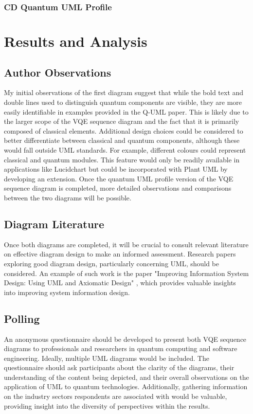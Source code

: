 \documentclass{article}
\begin{document}
\subsubsection{CD Quantum UML Profile}

\section{Results and Analysis}

\subsection{Author Observations}

My initial observations of the first diagram suggest that while the bold text and double lines used to distinguish quantum components are visible, they are more easily identifiable in examples provided in the Q-UML paper. This is likely due to the larger scope of the VQE sequence diagram and the fact that it is primarily composed of classical elements.
Additional design choices could be considered to better differentiate between classical and quantum components, although these would fall outside UML standards. For example, different colours could represent classical and quantum modules. This feature would only be readily available in applications like Lucidchart but could be incorporated with Plant UML by developing an extension.
Once the quantum UML profile version of the VQE sequence diagram is completed, more detailed observations and comparisons between the two diagrams will be possible.

\subsection{Diagram Literature}

Once both diagrams are completed, it will be crucial to consult relevant literature on effective diagram design to make an informed assessment. Research papers exploring good diagram design, particularly concerning UML, should be considered. An example of such work is the paper "Improving Information System Design: Using UML and Axiomatic Design" \cite{CAVIQUE2022103569}, which provides valuable insights into improving system information design.

\subsection{Polling}

An anonymous questionnaire should be developed to present both VQE sequence diagrams to professionals and researchers in quantum computing and software engineering. Ideally, multiple UML diagrams would be included. The questionnaire should ask participants about the clarity of the diagrams, their understanding of the content being depicted, and their overall observations on the application of UML to quantum technologies. Additionally, gathering information on the industry sectors respondents are associated with would be valuable, providing insight into the diversity of perspectives within the results.
\end{document}
